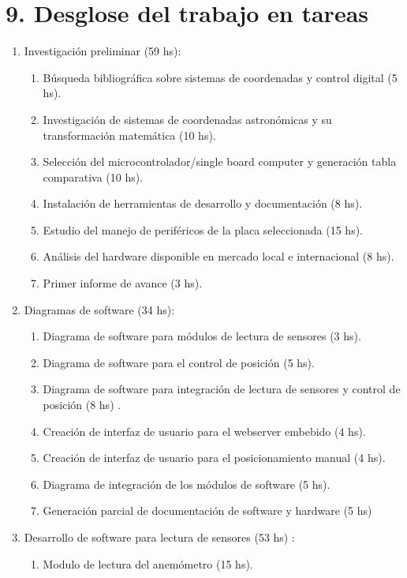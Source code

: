 \documentclass[11pt, %
codirector, %
]{charter}
\begin{document}
\section{9. Desglose del trabajo en tareas}
\label{sec:wbs}

\begin{enumerate}
\item Investigación preliminar (59 hs): 
	\begin{enumerate}
	\item Búsqueda bibliográfica sobre sistemas de coordenadas y control digital (5 hs). 
	\item Investigación de sistemas de coordenadas astronómicas y su transformación matemática (10 hs). 
	\item Selección del microcontrolador/single board computer y generación tabla comparativa (10 hs).  
	\item Instalación de herramientas de desarrollo y documentación (8 hs).
	\item Estudio del manejo de periféricos de la placa seleccionada (15 hs).
	\item Análisis del hardware disponible en mercado local e internacional (8 hs).
	\item Primer informe de avance (3 hs).  
	\end{enumerate}
\item Diagramas de software (34 hs): 
	\begin{enumerate}
		\item Diagrama de software para módulos de lectura de sensores (3 hs).  
		\item Diagrama de software para el control de posición (5 hs). 
		\item Diagrama de software para integración de lectura de sensores y control de posición (8 hs) . 
		\item Creación de interfaz de usuario para el webserver embebido (4 hs).
		\item Creación de interfaz de usuario para el posicionamiento manual (4 hs).
		\item Diagrama de integración de los módulos de software (5 hs). 
		\item Generación parcial de documentación de software y hardware (5 hs) 
	\end{enumerate}
\item Desarrollo de software para lectura de sensores (53 hs) :
	\begin{enumerate}
	\item Modulo de lectura del anemómetro (15 hs). 

\end{enumerate}
\end{enumerate}
\end{document}
